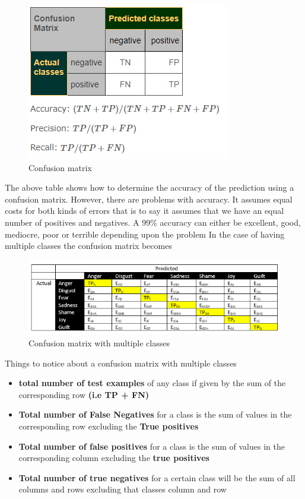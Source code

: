 \begin{figure}[h]
    \centering
    \includegraphics{images/confusion_matrix.png}
    \caption[Confusion matrix]{Confusion matrix}
\end{figure}

  The above table shows how to determine the accuracy of the prediction using a confusion matrix. However, there are problems with accuracy. It assumes equal costs for both kinds of errors that is to say it assumes that we have an equal number of positives and negatives. A 99\% accuracy can either be excellent, good, mediocre, poor or terrible depending upon the problem
\clearpage
In the case of having multiple classes the confusion matrix becomes


\begin{figure}[h]
    \centering
    \includegraphics{images/confusion_matrix_2.png}
    \caption{Confusion matrix with multiple classes}
\end{figure}

Things to notice about a confusion matrix with multiple classes
\begin{itemize}
\item \textbf{total number of test examples} of any class if given by the sum of the corresponding row \textbf{(i.e TP + FN)}
\item \textbf{Total number of False Negatives} for a class is the sum of values in the corresponding row excluding the \textbf{True positives}

\item \textbf{Total number of false positives} for a class is the sum of values in the corresponding column excluding the \textbf{true positives}

\item \textbf{Total number of true negatives} for a certain class will be the sum of all columns and rows  excluding that classes column and row
\end{itemize}
  
